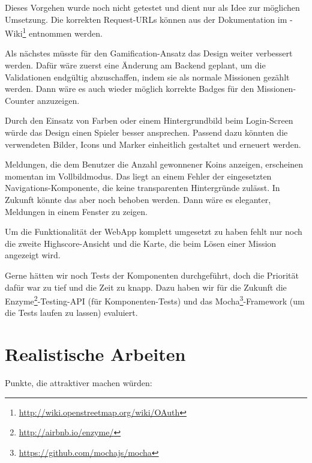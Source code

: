 Dieses Vorgehen wurde noch nicht getestet und dient nur als Idee zur möglichen Umsetzung.
Die korrekten Request-URLs können aus der Dokumentation im -Wiki\footnote{\url{http://wiki.openstreetmap.org/wiki/OAuth}} entnommen werden.

Als nächstes müsste für den \gls{Gamification}-Ansatz das Design weiter verbessert werden. 
Dafür wäre zuerst eine Änderung am Backend geplant, um die Validationen endgültig abzuschaffen, indem sie als normale Missionen gezählt werden. 
Dann wäre es auch wieder möglich korrekte Badges für den Missionen-Counter anzuzeigen. 

Durch den Einsatz von Farben oder einem Hintergrundbild beim Login-Screen würde das Design einen Spieler besser ansprechen.  
Passend dazu könnten die verwendeten Bilder, Icons und Marker einheitlich gestaltet und erneuert werden. 

Meldungen, die dem Benutzer die Anzahl gewonnener Koins anzeigen, erscheinen momentan im Vollbildmodus. 
Das liegt an einem Fehler der eingesetzten Navigations-Komponente, die keine transparenten Hintergründe zulässt. 
In Zukunft könnte das aber noch behoben werden. 
Dann wäre es eleganter, Meldungen in einem Fenster zu zeigen.

Um die Funktionalität der \gls{WebApp} komplett umgesetzt zu haben fehlt nur noch die zweite Highscore-Ansicht und die Karte, die beim Lösen einer Mission angezeigt wird.

Gerne hätten wir noch Tests der Komponenten durchgeführt, doch die Priorität dafür war zu tief und die Zeit zu knapp. 
Dazu haben wir für die Zukunft die Enzyme\footnote{\url{http://airbnb.io/enzyme/}}-Testing-API (für Komponenten-Tests) und das Mocha\footnote{\url{https://github.com/mochajs/mocha}}-\gls{Framework} (um die Tests laufen zu lassen) evaluiert.

\section{Realistische Arbeiten}
\label{pd-weiterentwicklung-realistisch}
Punkte, die \kort{} attraktiver machen würden:

